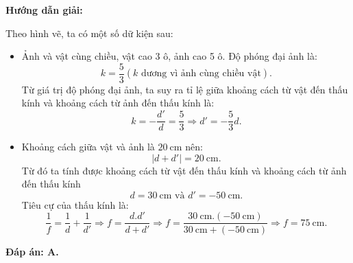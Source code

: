 {
\begin{center}
	\textbf{Hướng dẫn giải:}
\end{center}

{	Theo hình vẽ, ta có một số dữ kiện sau:
	\begin{itemize}
		\item Ảnh và vật cùng chiều, vật cao 3 ô, ảnh cao 5 ô.
		Độ phóng đại ảnh là:
		$$k=\dfrac{5}{3}(k\textrm{ dương vì ảnh cùng chiều vật}).$$
		Từ giá trị độ phóng đại ảnh, ta suy ra tỉ lệ giữa khoảng cách từ vật đến thấu kính và khoảng cách từ ảnh đến thấu kính là:
		$$k=-\dfrac{d'}{d}=\dfrac{5}{3}\Rightarrow d'=-\dfrac{5}{3}d.$$
		\item Khoảng cách giữa vật và ảnh là $\SI{20}{\centi\meter}$ nên:
		$$\left|d+d'\right|=\SI{20}{\centi\meter}.$$
		Từ đó ta tính được khoảng cách từ vật đến thấu kính và khoảng cách từ ảnh đến thấu kính
		$$d=\SI{30}{\centi\meter} \textrm{ và } d'=\SI{-50}{\centi\meter}.$$
		Tiêu cự của thấu kính là:
		$$\dfrac{1}{f}=\dfrac{1}{d}+\dfrac{1}{d'}\Rightarrow f =\dfrac{d.d'}{d+d'}\Rightarrow f =\dfrac{\SI{30}{\centi\meter}.(\SI{-50}{\centi\meter})}{\SI{30}{\centi\meter}+(\SI{-50}{\centi\meter})}\Rightarrow f =\SI{75}{\centi\meter}.$$
	\end{itemize}
\textbf{	Đáp án: A.}
	
	
	
	
} 
}

